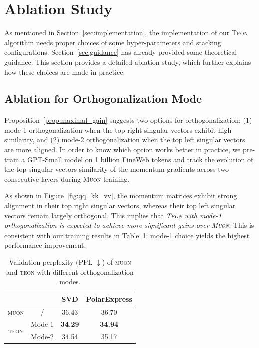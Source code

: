 \documentclass{article}
\theoremstyle{plain}
\theoremstyle{definition}
\theoremstyle{remark}
\begin{document}
\vspace{-5pt}
\section{Ablation Study}
\label{sec:ablation}

As mentioned in Section~\ref{sec:implementation}, the implementation of our \textsc{Teon} algorithm needs proper choices of some hyper-parameters and stacking configurations. Section~\ref{sec:guidance} has already provided some theoretical guidance. This section provides a detailed ablation study, which further explains how these choices are made in practice. 

\subsection{Ablation for Orthogonalization Mode}
\label{sec:ablation-mode}
Proposition~\ref{prop:maximal_gain} suggests two options for orthogonalization: (1) mode-1 orthogonalization when the top right singular vectors exhibit high similarity, and (2) mode-2 orthogonalization when the top left singular vectors are more aligned. In order to know which option works better in practice, we pre-train a GPT-Small model on 1 billion FineWeb tokens and track the evolution of the top singular vectors similarity of the momentum gradients across two consecutive layers during \textsc{Muon} training. 

As shown in Figure~\ref{fig:qq_kk_vv}, the momentum matrices exhibit strong alignment in their top right singular vectors, whereas their top left singular vectors remain largely orthogonal. This implies that {\it \textsc{Teon} with mode-1 orthogonalization is expected to achieve more significant gains over \textsc{Muon}}. This is consistent with our training results in Table~\ref{tab:Teon modes}: mode-1 choice yields the highest performance improvement.
\begin{table}[t]
  \centering
  \footnotesize
    \begin{tabular}{cccc}
    \toprule
          &       & SVD   & PolarExpress \\
    \midrule
    \textsc{muon} & /     & 36.43 & 36.70 \\
    \midrule
    \multirow{2}[4]{*}{\textsc{teon}} & Mode-1 & \textbf{34.29} & \textbf{34.94} \\
    \cmidrule{2-4}      & Mode-2 & 34.54 & 35.17 \\
    \bottomrule
    \end{tabular}%
    
  \caption{Validation perplexity (PPL $\downarrow$) of \textsc{muon} and \textsc{teon} with different orthogonalization modes.}
\vspace{-10pt}
  \label{tab:Teon modes}%
\end{table}%
\end{document}
